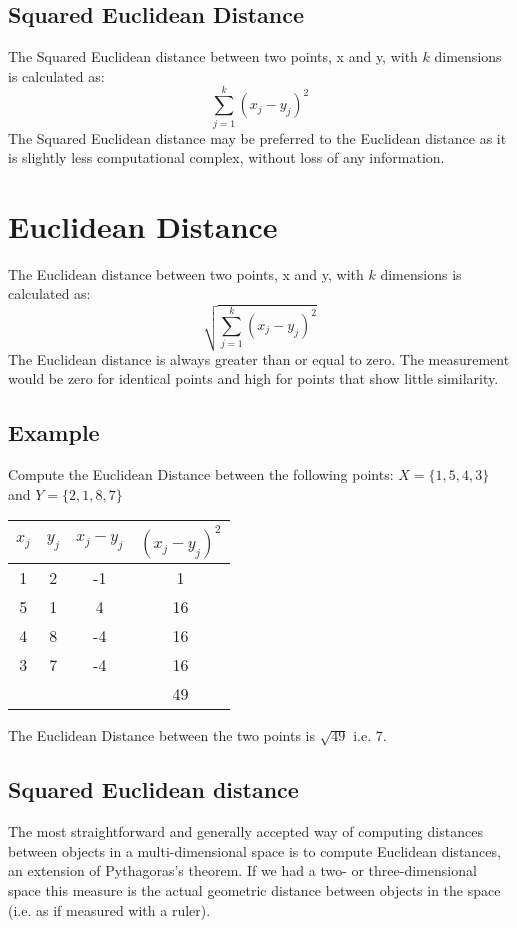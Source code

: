 \subsection{Squared Euclidean Distance}
The Squared Euclidean distance between two points, x and y, with $k$ dimensions is calculated as:
\[ \sum^{k}_{j=1} ( x_j - y_j)^2  \]
The Squared Euclidean distance may be preferred to the Euclidean distance as it is slightly less computational complex, without loss of any information.
\newpage
\section{Euclidean Distance}
The Euclidean distance between two points, x and y, with $k$ dimensions is calculated as:
\[ \sqrt{ \sum^{k}_{j=1} ( x_j - y_j)^2 } \]
The Euclidean distance is always greater than or equal to zero. The measurement would be zero for identical points and high for points that show little similarity.
\subsection{Example}
Compute the Euclidean Distance between the following points:
$X = \{1,5,4,3\}$ and $Y = \{2,1,8,7\}$

\begin{center}
	\begin{tabular}{|c|c|c|c|}
		\hline
		$x_j$	&	$y_j$	&   $x_j - y_j$	&	$(x_j - y_j)^2$	\\ \hline
		1	&	2	&	-1	&	1	\\
		5	&	1	&	4	&	16	\\
		4	&	8	&	-4	&	16	\\
		3	&	7	&	-4	&	16	\\ \hline
		&		&		&	49	\\ \hline
	\end{tabular}
\end{center}
The Euclidean Distance between the two points is $\sqrt{49}$ i.e. 7.
\subsection{Squared Euclidean distance}

The most straightforward and generally accepted way of computing distances between objects in a multi-dimensional space is to compute Euclidean distances, an extension of Pythagoras's theorem.
If we had a two- or three-dimensional space this measure is the actual geometric distance between objects in the space (i.e. as if measured with a ruler).

